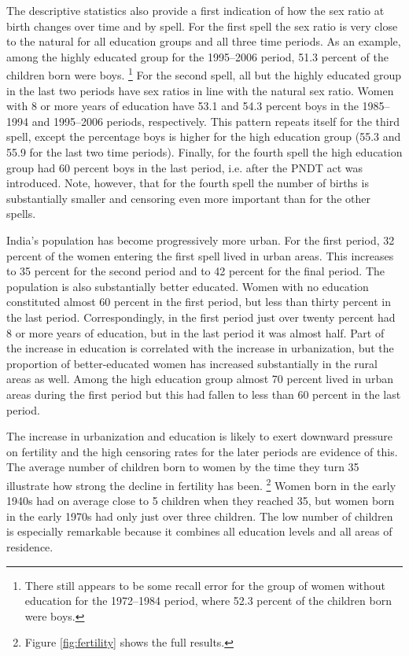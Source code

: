 \documentclass[12pt,letterpaper]{article}
\begin{document}
The descriptive statistics also provide a first indication of how the
sex ratio at birth changes over time and by spell.
For the first spell the sex ratio is very close to the natural
for all education groups and all three time periods.
As an example, among the highly educated group for the 1995--2006 period,
51.3 percent of the children born were boys.%
\footnote{
There still appears to be some recall error for the group of women without
education for the 1972--1984 period, where 52.3 percent of the children born were boys.
}
For the second spell, all but the highly educated group in the last two
periods have sex ratios in line with the natural sex ratio.
Women with 8 or more years of education have 53.1 and 54.3 percent
boys in the 1985--1994 and 1995--2006 periods, respectively.
This pattern repeats itself for the third spell, except the percentage
boys is higher for the high education group (55.3 and 55.9 for the last
two time periods).
Finally, for the fourth spell the high education group 
had 60 percent boys in the last period, i.e. after the PNDT act was introduced.
Note, however, that for the fourth spell the number of births is substantially
smaller and censoring even more important than for the other spells.

India's population has become progressively more urban.
For the first period, 32 percent of the women entering the first spell lived in urban areas.
This increases to 35 percent for the second period and to 42 percent for the final period.
The population is also substantially better educated.
Women with no education constituted almost 60 percent 
in the first period, but less than thirty percent in the last period.
Correspondingly, in the first period just over twenty percent had 8 or more 
years of education, but in the last period it was almost half.
Part of the increase in education is correlated with the increase in urbanization,
but the proportion of better-educated women has increased substantially
in the rural areas as well.
Among the high education group almost 70 percent lived in urban areas
during the first period but this had fallen to less than 60 percent
in the last period.

The increase in urbanization and education is likely to exert downward pressure
on fertility and the high censoring rates for the later periods are evidence of this.
The average number of children born to women by the time they turn 35 illustrate how
strong the decline in fertility has been.%
\footnote{
Figure \ref{fig:fertility} shows the full results.
}
Women born in the early 1940s had on average close to 5 children when 
they reached 35, but women born in the early 1970s had only just over three children.
The low number of children is especially remarkable because it combines
all education levels and all areas of residence.
\end{document}
